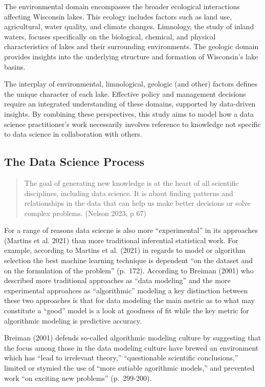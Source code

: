\documentclass[
]{article}
\begin{document}
The environmental domain encompasses the broader ecological interactions
affecting Wisconsin lakes. This ecology includes factors such as land
use, agricultural, water quality, and climate changes. Limnology, the
study of inland waters, focuses specifically on the biological,
chemical, and physical characteristics of lakes and their surrounding
environments. The geologic domain provides insights into the underlying
structure and formation of Wisconsin's lake basins.

The interplay of environmental, limnological, geologic (and other)
factors defines the unique character of each lake. Effective policy and
management decisions require an integrated understanding of these
domains, supported by data-driven insights. By combining these
perspectives, this study aims to model how a data science practitioner's
work necessarily involves reference to knowledge not specific to data
science in collaboration with others.

\subsection{The Data Science Process}\label{the-data-science-process}

\begin{quote}
The goal of generating new knowledge is at the heart of all scientific
disciplines, including data science. It is about finding patterns and
relationships in the data that can help us make better decisions or
solve complex problems. (Nelson 2023, p 67)
\end{quote}

For a range of reasons data sciecne is also more ``experimental'' in its
approaches (Martins et al. 2021) than more traditional inferential
statistical work. For example, according to Martins et al. (2021) in
regards to model or algorithm selection the best machine learning
technique is dependent ``on the dataset and on the formulation of the
problem'' (p.~172). According to Breiman (2001) who described more
traditional approaches as ``data modeling'' and the more experimental
approahces as ``algorithmic'' modeling a key distinction between these
two approaches is that for data modeling the main metric as to what may
constitute a ``good'' model is a look at goodness of fit while the key
metric for algorithmic modeling is predictive accuracy.

Breiman (2001) defends so-called algorithmic modeling culture by
suggesting that the focus among those in the data modeling culture have
brewed an environment which has ``lead to irrelevant theory,''
``questionable scientific conclusions,'' limited or stymied the use of
``more sutiable agorithmic models,'' and prevented work ``on exciting
new problems'' (p.~299-200).
\end{document}
